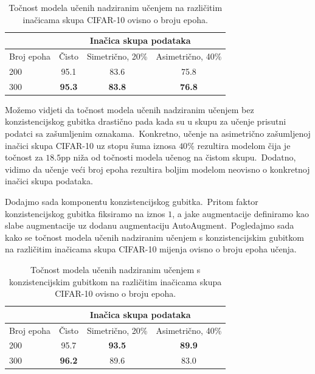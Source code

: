 \documentclass[diplomskirad]{fer}
\begin{document}
\begin{table}[htb]
  \caption{Točnost modela učenih nadziranim učenjem na različitim inačicama skupa CIFAR-10 ovisno o broju epoha.}
  \label{tbl:usporedba_nadzirano}
  \centering
  \begin{tabular}{l||ccc}
  & \multicolumn{3}{c}{Inačica skupa podataka} \\ \hline
  Broj epoha & Čisto & Simetrično, 20\% & Asimetrično, 40\% \\ \hline \hline
  200 & 95.1 & 83.6 & 75.8 \\
  300 & \textbf{95.3} & \textbf{83.8} & \textbf{76.8} \\
  \end{tabular}
\end{table}

Možemo vidjeti da točnost modela učenih nadziranim učenjem bez konzistencijskog gubitka drastično pada kada su u skupu za učenje prisutni podatci sa zašumljenim oznakama.\ 
Konkretno, učenje na asimetrično zašumljenoj inačici skupa CIFAR-10 uz stopu šuma iznosa $40\%$ rezultira modelom čija je točnost za $18.5$pp niža od točnosti modela učenog na čistom skupu.\ 
Dodatno, vidimo da učenje veći broj epoha rezultira boljim modelom neovisno o konkretnoj inačici skupa podataka.\ 

Dodajmo sada komponentu konzistencijskog gubitka.\ Pritom faktor konzistencijskog gubitka fiksiramo na iznos $1$, a jake augmentacije definiramo kao slabe augmentacije uz dodanu augmentaciju AutoAugment.\ 
Pogledajmo sada kako se točnost modela učenih nadziranim učenjem s konzistencijskim gubitkom na različitim inačicama skupa CIFAR-10 mijenja ovisno o broju epoha učenja.\ 

\begin{table}[htb]
  \caption{Točnost modela učenih nadziranim učenjem s konzistencijskim gubitkom na različitim inačicama skupa CIFAR-10 ovisno o broju epoha.}
  \label{tbl:usporedba_nadzirano_con_loss}
  \centering
  \begin{tabular}{l||ccc}
  & \multicolumn{3}{c}{Inačica skupa podataka} \\ \hline
  Broj epoha & Čisto & Simetrično, 20\% & Asimetrično, 40\% \\ \hline \hline
  200 & 95.7 & \textbf{93.5} & \textbf{89.9} \\
  300 & \textbf{96.2} & 89.6 & 83.0 \\
  \end{tabular}
\end{table}
\end{document}
